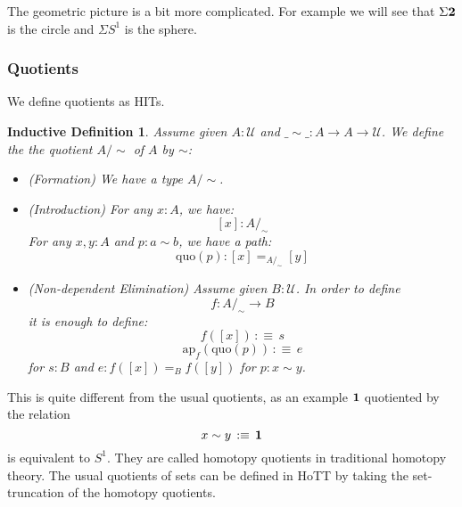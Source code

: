 \documentclass{article}
\newcommand{\ssse}[1]{\subsubsection*{#1}}
\newcommand{\U}{{\mathcal U}}
\renewcommand{\r}{\rightarrow}
\newcommand{\ap}{\mathrm{ap}}
\newcommand{\one}{{\bf 1}}
\newcommand{\two}{{\bf 2}}
\newtheorem{remark}{Remark}
\newtheorem{ind_def}{Inductive Definition}
\begin{document}
The geometric picture is a bit more complicated. For example we will see that $\Sigma \two$ is the circle and $\Sigma S^1$ is the sphere.






\ssse{Quotients}

We define quotients as HITs. 

\begin{ind_def}
Assume given $A:\U$ and $\_\sim\_:A\r A\r \U$. We define the the quotient $A/\sim$ of $A$ by $\sim$:
\begin{itemize}
\item (Formation) We have a type $A/\sim$.
\item (Introduction) For any $x:A$, we have:
\[[x] : A/_\sim\] 
For any $x,y:A$ and $p:a\sim b$, we have a path:
\[\mathrm{quo}(p) : [x] =_{A/_\sim} [y]\]
\item (Non-dependent Elimination) Assume given $B : \U$. In order to define 
\[f:A/_\sim\r B\]
 it is enough to define:
\[f([x]) \, :\equiv \, s \]
\[\ap_f(\mathrm{quo}(p)) \, :\equiv\, e\]
for $s:B$ and $e:f([x])=_{B}f([y])$ for $p:x\sim y$.
\end{itemize}
\end{ind_def}

This is quite different from the usual quotients, as an example $\one$ quotiented by the relation 
\[x\sim y \, :\equiv\, \one\]
is equivalent to $S^1$. They are called homotopy quotients in traditional homotopy theory. The usual quotients of sets can be defined in HoTT by taking the set-truncation of the homotopy quotients. 
\end{document}
